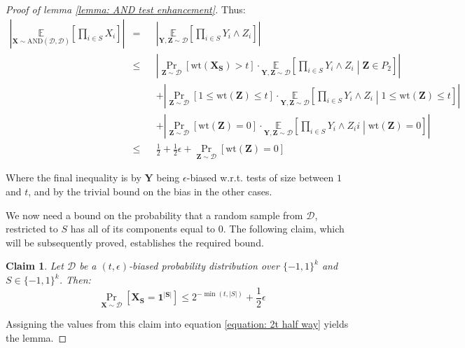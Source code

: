 \documentclass[12pt]{article}
\newtheorem{claim}[theorem]{Claim}
\newcommand{\oo}[1]{\{-1,1\}^{#1}}
\newcommand{\dist}{\mathcal{D}}
\newcommand{\AND}{\mathrm{AND} }
\newcommand{\E}{\mathbb{E}}
\newcommand{\abs}[1]{\left| #1 \right|}
\renewcommand{\vec}[1]{\bm{#1}}
\newcommand{\wt}[1]{\mathrm{wt}\left(#1\right)}
\begin{document}
\begin{proof}[Proof of lemma \ref{lemma: AND test enhancement}]
		Thus:
		\begin{equation} \label{equation: 2t half way}
		\begin{alignedat}{3}
			\abs{\underset{\vec{X} \sim \AND(\dist,\dist)}{\E} \left[ \prod_{i \in S}{X_i} \right]}
			&= && \abs{ \underset{\vec{Y},\vec{Z} \sim \dist}{\E}
				\left[
					\prod_{i \in S} Y_i \wedge Z_i
				\right]} \\
			&\leq && \abs{ \Pr_{\vec{Z} \sim \dist} \left[ \wt{\vec{X_S}} > t \right]
					\cdot \underset{\vec{Y},\vec{Z} \sim \dist}{\E}
						\left[
							\prod_{i \in S} Y_i \wedge Z_i \middle| \vec{Z} \in P_2
						\right]} \\
			& && + \abs{ \Pr_{\vec{Z} \sim \dist} \left[ 1 \leq \wt{\vec{Z}} \leq t \right]
					\cdot \underset{\vec{Y},\vec{Z} \sim \dist}{\E}
						\left[
							\prod_{i \in S} Y_i \wedge Z_i \middle| 1 \leq \wt{\vec{Z}} \leq t
						\right] }\\
			& && + \abs{ \Pr_{\vec{Z} \sim \dist} \left[ \wt{\vec{Z}} = 0 \right]
					\cdot \underset{\vec{Y},\vec{Z} \sim \dist}{\E}
						\left[
							\prod_{i \in S} Y_i \wedge Z_ii \middle| \wt{\vec{Z}} = 0
						\right] }\\
			&\leq && \frac{1}{2} + \frac{1}{2}\epsilon + \Pr_{\vec{Z} \sim \dist} \left[ \wt{\vec{Z}} = 0 \right]
		\end{alignedat}
		\end{equation}
		
		Where the final inequality is by $\vec{Y}$ being $\epsilon$-biased w.r.t. tests of size between $1$ and $t$, and by the trivial bound on the bias in the other cases.
		
		We now need a bound on the probability that a random sample from $\dist$, restricted to $S$ has all of its components equal to $0$.
		The following claim, which will be subsequently proved, establishes the required bound.
		
		\begin{claim}  \label{claim: Zero vector probability}
			Let $\dist$ be a $(t,\epsilon)$-biased probability distribution over $\oo{k}$ and $S \in \oo{k}$. Then:
			\begin{equation*}
				\Pr_{\vec{X} \sim \dist} \left[ \vec{X_S} = \vec{1^{\abs{S}}} \right]
				\leq 2^{-\min(t, \abs{S})} + \frac{1}{2}\epsilon
			\end{equation*}
		\end{claim}
		
		Assigning the values from this claim into equation \ref{equation: 2t half way} yields the lemma.
		
	\end{proof}
	
\end{document}
